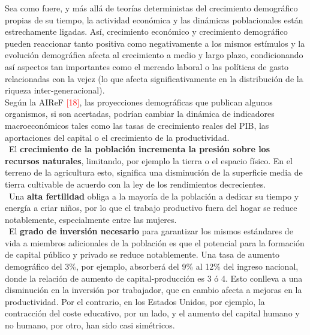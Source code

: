\vspace{-0.2cm}
Sea como fuere, y m\'as all\'a de teor\'ias deterministas del crecimiento demogr\'afico propias de su tiempo, la actividad económica y las dinámicas poblacionales están estrechamente ligadas. Así, crecimiento econ\'omico y crecimiento demogr\'afico pueden reaccionar tanto positiva como negativamente a los mismos est\'imulos y la evolución demográfica afecta al crecimiento a medio y largo plazo, condicionando así aspectos tan importantes como el mercado laboral o las políticas de gasto relacionadas con la vejez (lo que afecta significativamente en la distribución de la riqueza inter-generacional). \\

\vspace{-0.2cm}
Según la AIReF \textcolor{red}{[18]}, las proyecciones demográficas que publican algunos organismos, si son acertadas, podrían cambiar la dinámica de indicadores macroeconómicos tales como las tasas de crecimiento reales del PIB, las aportaciones del capital o el crecimiento de la productividad.\\

\vspace{-0.2cm}
\noindent \textbullet\ El \textbf{crecimiento de la poblaci\'on incrementa la presi\'on sobre los recursos naturales}, limitando, por ejemplo la tierra o el espacio f\'isico. En el terreno de la agricultura esto, significa una disminuci\'on de la superficie media de tierra cultivable de acuerdo con la ley de los rendimientos decrecientes.\\

\vspace{-0.2cm}
\noindent \textbullet\ Una \textbf{alta fertilidad} obliga a la mayor\'ia de la poblaci\'on a dedicar su tiempo y energ\'ia a criar ni\~nos, por lo que el trabajo productivo fuera del hogar se reduce notablemente, especialmente entre las mujeres.\\

\vspace{-0.2cm}
\noindent \textbullet\ El \textbf{grado de inversi\'on necesario} para garantizar los mismos est\'andares de vida a miembros adicionales de la poblaci\'on es que el potencial para la formaci\'on de capital p\'ublico y privado se reduce notablemente. Una tasa de aumento demogr\'afico del 3\%, por ejemplo, absorber\'a del 9\% al 12\% del ingreso nacional, donde la relaci\'on de aumento de capital-producci\'on es 3 \'o 4. Esto conlleva a una disminuci\'on en la inversi\'on por trabajador, que en cambio afecta a mejoras en la productividad. Por el contrario, en los Estados Unidos, por ejemplo, la contracci\'on del coste educativo, por un lado, y el aumento del capital humano y no humano, por otro, han sido casi sim\'etricos.\\

